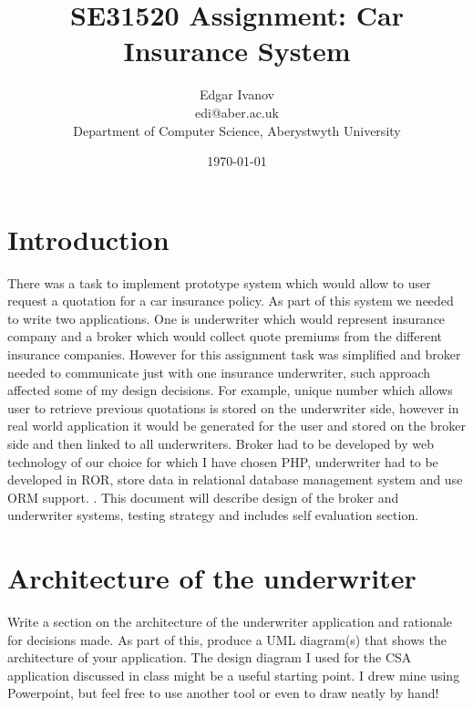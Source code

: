 \documentclass[10pt,a4paper,headinclude=true,twoside]{report}
\begin{document}
\title{SE31520 Assignment: Car Insurance System}
\author{Edgar Ivanov\\ edi@aber.ac.uk \\ Department of Computer Science, Aberystwyth University}
\date{\today}
\maketitle

\newpage
\thispagestyle{empty}
\mbox{}

\tableofcontents

\section{Introduction}
There was a task to implement prototype system which would allow to user request a quotation for a car insurance policy. As part of this system we needed to write two applications. One is underwriter which would represent insurance company and a broker which would collect quote premiums from the different insurance companies. However for this assignment task was simplified and broker needed to communicate just with one insurance underwriter, such approach affected some of my design decisions. For example, unique number which allows user to retrieve previous quotations is stored on the underwriter side, however in real world application it would be generated for the user and stored on the broker side and then linked to all underwriters. Broker had to be developed by web technology of our choice for which I have chosen PHP, underwriter had to be developed in ROR, store data in relational database management system and use ORM support. . This document will describe design of the broker and underwriter systems, testing strategy and includes self evaluation section.  

\section{Architecture of the underwriter}
Write a section on the architecture of the underwriter application and
rationale for decisions made. As part of this, produce a UML
diagram(s) that shows the architecture of your application. The design
diagram I used for the CSA application discussed in class might be a
useful starting point. I drew mine using Powerpoint, but feel free to use
another tool or even to draw neatly by hand!
\end{document}
